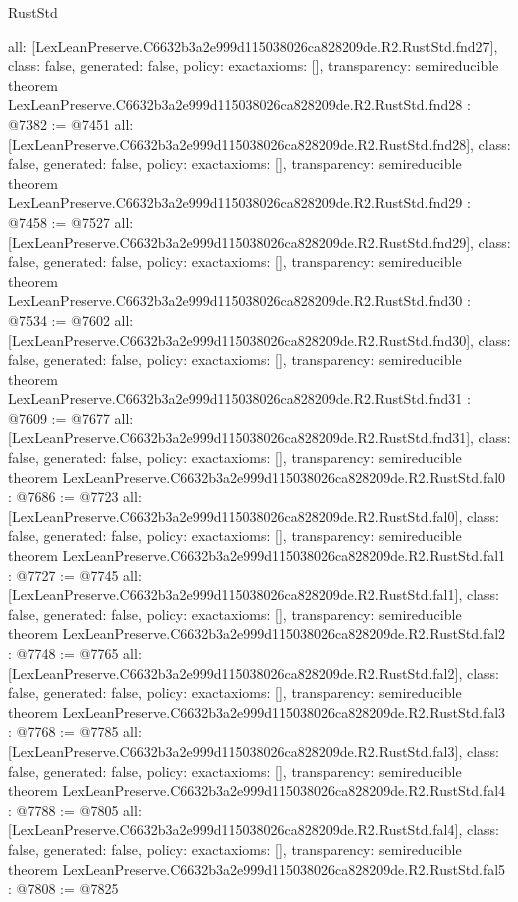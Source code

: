\begin{lexlean}{RustStd}
\begin{coremodule}
{  all: [LexLeanPreserve.C6632b3a2e999d115038026ca828209de.R2.RustStd.fnd27],
  class: false,
  generated: false,
  policy: exact{axioms: []},
  transparency: semireducible
}
theorem LexLeanPreserve.C6632b3a2e999d115038026ca828209de.R2.RustStd.fnd28 : @7382 := @7451 {
  all: [LexLeanPreserve.C6632b3a2e999d115038026ca828209de.R2.RustStd.fnd28],
  class: false,
  generated: false,
  policy: exact{axioms: []},
  transparency: semireducible
}
theorem LexLeanPreserve.C6632b3a2e999d115038026ca828209de.R2.RustStd.fnd29 : @7458 := @7527 {
  all: [LexLeanPreserve.C6632b3a2e999d115038026ca828209de.R2.RustStd.fnd29],
  class: false,
  generated: false,
  policy: exact{axioms: []},
  transparency: semireducible
}
theorem LexLeanPreserve.C6632b3a2e999d115038026ca828209de.R2.RustStd.fnd30 : @7534 := @7602 {
  all: [LexLeanPreserve.C6632b3a2e999d115038026ca828209de.R2.RustStd.fnd30],
  class: false,
  generated: false,
  policy: exact{axioms: []},
  transparency: semireducible
}
theorem LexLeanPreserve.C6632b3a2e999d115038026ca828209de.R2.RustStd.fnd31 : @7609 := @7677 {
  all: [LexLeanPreserve.C6632b3a2e999d115038026ca828209de.R2.RustStd.fnd31],
  class: false,
  generated: false,
  policy: exact{axioms: []},
  transparency: semireducible
}
theorem LexLeanPreserve.C6632b3a2e999d115038026ca828209de.R2.RustStd.fal0 : @7686 := @7723 {
  all: [LexLeanPreserve.C6632b3a2e999d115038026ca828209de.R2.RustStd.fal0],
  class: false,
  generated: false,
  policy: exact{axioms: []},
  transparency: semireducible
}
theorem LexLeanPreserve.C6632b3a2e999d115038026ca828209de.R2.RustStd.fal1 : @7727 := @7745 {
  all: [LexLeanPreserve.C6632b3a2e999d115038026ca828209de.R2.RustStd.fal1],
  class: false,
  generated: false,
  policy: exact{axioms: []},
  transparency: semireducible
}
theorem LexLeanPreserve.C6632b3a2e999d115038026ca828209de.R2.RustStd.fal2 : @7748 := @7765 {
  all: [LexLeanPreserve.C6632b3a2e999d115038026ca828209de.R2.RustStd.fal2],
  class: false,
  generated: false,
  policy: exact{axioms: []},
  transparency: semireducible
}
theorem LexLeanPreserve.C6632b3a2e999d115038026ca828209de.R2.RustStd.fal3 : @7768 := @7785 {
  all: [LexLeanPreserve.C6632b3a2e999d115038026ca828209de.R2.RustStd.fal3],
  class: false,
  generated: false,
  policy: exact{axioms: []},
  transparency: semireducible
}
theorem LexLeanPreserve.C6632b3a2e999d115038026ca828209de.R2.RustStd.fal4 : @7788 := @7805 {
  all: [LexLeanPreserve.C6632b3a2e999d115038026ca828209de.R2.RustStd.fal4],
  class: false,
  generated: false,
  policy: exact{axioms: []},
  transparency: semireducible
}
theorem LexLeanPreserve.C6632b3a2e999d115038026ca828209de.R2.RustStd.fal5 : @7808 := @7825 {
}
\end{coremodule}
\end{lexlean}
